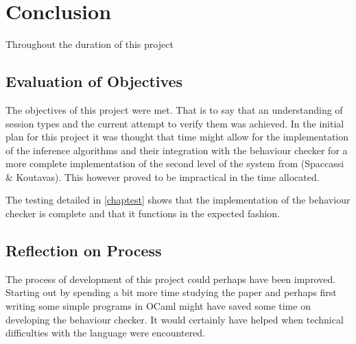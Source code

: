 \chapter{Conclusion}

Throughout the duration of this project 

\section{Evaluation of Objectives}

The objectives of this project were met. That is to say that an understanding of session types and the current attempt to verify them was achieved. In the initial plan for this project it was thought that time might allow for the implementation of the inference algorithms and their integration with the behaviour checker for a more complete implementation of the second level of the system from (Spaccassi \& Koutavas)\cite{paper1}. This however proved to be impractical in the time allocated. 

The testing detailed in \ref{chaptest} shows that the implementation of the behaviour checker is complete and that it functions in the expected fashion. 

\section{Reflection on Process}

The process of development of this project could perhaps have been improved. Starting out by spending a bit more time studying the paper and perhaps first writing some simple programs in OCaml might have saved some time on developing the behaviour checker. It would certainly have helped when technical difficulties with the language were encountered. 

